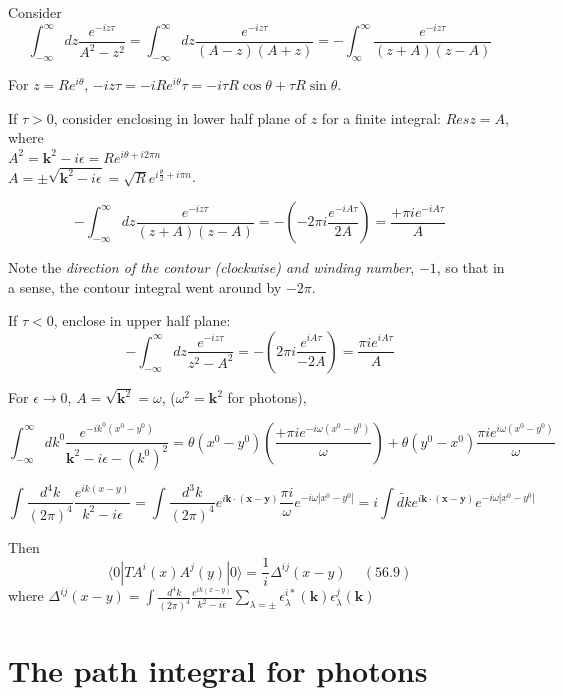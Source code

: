 \documentclass[twoside]{amsart}
\begin{document}
Consider
\[
\int_{-\infty}^{\infty} dz \frac{e^{-iz \tau}}{ A^2 - z^2} = \int_{-\infty}^{\infty} dz \frac{ e^{-iz\tau} }{ (A-z)(A+z) } = -\int_{\infty}^{\infty} \frac{ e^{-iz \tau} }{ (z+ A)(z-A) }
\]

For $z = Re^{i\theta }$, $-iz \tau = -i Re^{i\theta} \tau = - i \tau R\cos{\theta} + \tau R\sin{\theta}$.  

If $\tau >0$, consider enclosing in lower half plane of $z$ for a finite integral: $Res{z} = A$, where \\
$A^2 = \mathbf{k}^2 - i \epsilon = Re^{i\theta + i2\pi n }$ \\ 
$A = \pm \sqrt{ \mathbf{k}^2 -  i\epsilon} = \sqrt{R} e^{ i \frac{\theta}{2} + i \pi n }$.  

\[
-\int_{ -\infty}^{\infty} dz \frac{e^{-iz \tau}}{ (z+A)(z-A) }  = - \left( - 2\pi i \frac{e^{-i A\tau} }{2A} \right) = \frac{ + \pi i e^{-iA \tau}}{A}
\]

Note the \emph{direction of the contour (clockwise) and winding number}, $-1$, so that in a sense, the contour integral went around by $-2\pi$.

If $\tau < 0$, enclose in upper half plane: 
\[
-\int_{-\infty}^{\infty} dz \frac{e^{-iz\tau} }{ z^2 - A^2 } = - \left( 2\pi i \frac{ e^{ iA \tau}}{ -2A } \right) = \frac{ \pi i e^{iA \tau} }{ A }
\]

For $\epsilon \to 0$, $A = \sqrt{ \mathbf{k}^2} = \omega$, ($\omega^2 = \mathbf{k}^2$ for photons),

\[
\int_{-\infty}^{\infty} dk^0 \frac{e^{-ik^0(x^0- y^0)}}{ \mathbf{k}^2 - i\epsilon - (k^0)^2 } = \theta(x^0 - y^0) \left( \frac{ + \pi i e^{-i \omega (x^0 - y^0)} }{\omega} \right) + \theta(y^0 - x^0) \frac{ \pi i e^{i \omega(x^0 - y^0 ) } }{ \omega} 
\]

\[
\int \frac{ d^4k}{ (2\pi)^4} \frac{ e^{ik(x-y) } }{ k^2 - i \epsilon } = \int \frac{d^3k}{(2\pi)^4} e^{i \mathbf{k} \cdot( \mathbf{x} - \mathbf{y} ) } \frac{ \pi i }{\omega} e^{-i\omega |x^0 - y^0 | } = i \int \widetilde{dk} e^{ i \mathbf{k}\cdot (\mathbf{x} - \mathbf{y} ) } e^{-i \omega |x^0 - y^0 | }
\]

Then 
\[
\boxed{ \langle 0 | T A^i(x) A^j(y) |0\rangle = \frac{1}{i} \Delta^{ij}(x-y)  }\quad \, (56.9) 
\]
where $\boxed{ \Delta^{ij}(x-y) = \int \frac{d^4k}{(2\pi)^4} \frac{e^{ik(x-y)}}{ k^2 - i \epsilon} \sum_{\lambda =\pm } \epsilon_{\lambda}^{i*}(\mathbf{k}) \epsilon_{\lambda}^j(\mathbf{k})}$  

\section{The path integral for photons}  
\end{document}
